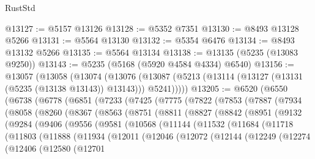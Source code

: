 \begin{lexlean}{RustStd}
\begin{coremodule}
@13127 := @5157 @13126
@13128 := @5352 @7351
@13130 := @8493 @13128 @5266
@13131 := @5564 @13130
@13132 := @5354 @6476
@13134 := @8493 @13132 @5266
@13135 := @5564 @13134
@13138 := @13135 (@5235 (@13083 @9250))
@13143 := @5235 (@5168 (@5920 @4584 @4334) @6540)
@13156 := @13057
    (@13058
      (@13074
        (@13076 (@13087 (@5213 (@13114 (@13127 (@13131 (@5235 (@13138 @13143)) @13143))) @5241)))))
@13205 := @6520
    (@6550
      (@6738
        (@6778
          (@6851
            (@7233
              (@7425
                (@7775
                  (@7822
                    (@7853
                      (@7887
                        (@7934
                          (@8058
                            (@8260
                              (@8367
                                (@8563
                                  (@8751
                                    (@8811
                                      (@8827
                                        (@8842
                                          (@8951
                                            (@9132
                                              (@9284
                                                (@9406
                                                  (@9556
                                                    (@9581
                                                      (@10568
                                                        (@11144
                                                          (@11532
                                                            (@11684
                                                              (@11718
                                                                (@11803
                                                                  (@11888
                                                                    (@11934
                                                                      (@12011
                                                                        (@12046
                                                                          (@12072
                                                                            (@12144
                                                                              (@12249
                                                                                (@12274
                                                                                  (@12406
                                                                                    (@12580
                                                                                      (@12701

\end{coremodule}
\end{lexlean}
